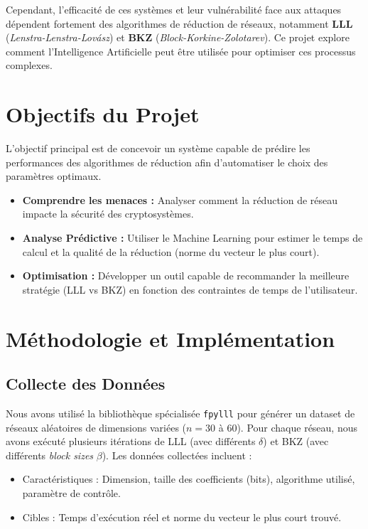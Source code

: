 \documentclass[12pt,a4paper]{article}
\begin{document}
Cependant, l'efficacité de ces systèmes et leur vulnérabilité face aux attaques dépendent fortement des algorithmes de réduction de réseaux, notamment \textbf{LLL} (\textit{Lenstra-Lenstra-Lovász}) et \textbf{BKZ} (\textit{Block-Korkine-Zolotarev}). Ce projet explore comment l'Intelligence Artificielle peut être utilisée pour optimiser ces processus complexes.

\section{Objectifs du Projet}
L'objectif principal est de concevoir un système capable de prédire les performances des algorithmes de réduction afin d'automatiser le choix des paramètres optimaux.
\begin{itemize}
    \item \textbf{Comprendre les menaces :} Analyser comment la réduction de réseau impacte la sécurité des cryptosystèmes.
    \item \textbf{Analyse Prédictive :} Utiliser le Machine Learning pour estimer le temps de calcul et la qualité de la réduction (norme du vecteur le plus court).
    \item \textbf{Optimisation :} Développer un outil capable de recommander la meilleure stratégie (LLL vs BKZ) en fonction des contraintes de temps de l'utilisateur.
\end{itemize}

\section{Méthodologie et Implémentation}

\subsection{Collecte des Données}
Nous avons utilisé la bibliothèque spécialisée \texttt{fpylll} pour générer un dataset de réseaux aléatoires de dimensions variées ($n=30$ à $60$). Pour chaque réseau, nous avons exécuté plusieurs itérations de LLL (avec différents $\delta$) et BKZ (avec différents \textit{block sizes} $\beta$).
Les données collectées incluent :
\begin{itemize}
    \item Caractéristiques : Dimension, taille des coefficients (bits), algorithme utilisé, paramètre de contrôle.
    \item Cibles : Temps d'exécution réel et norme du vecteur le plus court trouvé.
\end{itemize}
\end{document}
